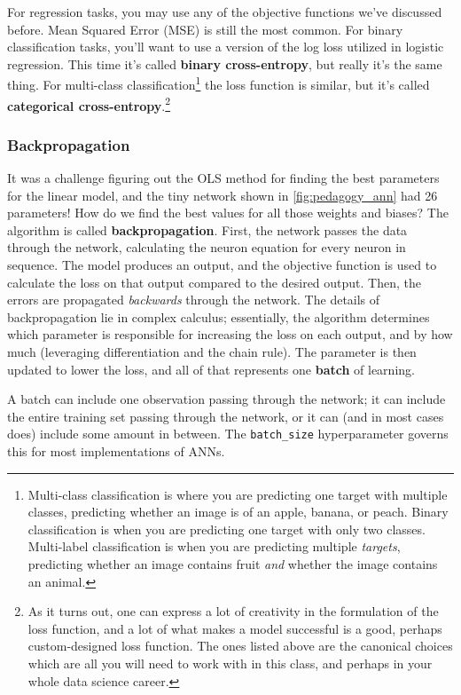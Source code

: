 For regression tasks, you may use any of the objective functions we've discussed before. Mean Squared Error (MSE) is still the most common. For binary classification tasks, you'll want to use a version of the log loss utilized in logistic regression. This time it's called \textbf{binary cross-entropy}, but really it's the same thing. For multi-class classification\footnote{Multi-class classification is where you are predicting one target with multiple classes, \eg{} predicting whether an image is of an apple, banana, or peach. Binary classification is when you are predicting one target with only two classes. Multi-label classification is when you are predicting multiple \textit{targets}, \eg{} predicting whether an image contains fruit \textit{and} whether the image contains an animal.} the loss function is similar, but it's called \textbf{categorical cross-entropy}.\footnote{As it turns out, one can express a lot of creativity in the formulation of the loss function, and a lot of what makes a model successful is a good, perhaps custom-designed loss function. The ones listed above are the canonical choices which are all you will need to work with in this class, and perhaps in your whole data science career.}

\subsubsection*{Backpropagation}
It was a challenge figuring out the OLS method for finding the best parameters for the linear model, and the tiny network shown in \autoref{fig:pedagogy_ann} had 26 parameters! How do we find the best values for all those weights and biases? The algorithm is called \textbf{backpropagation}. First, the network passes the data through the network, calculating the neuron equation for every neuron in sequence. The model produces an output, and the objective function is used to calculate the loss on that output compared to the desired output. Then, the errors are propagated \textit{backwards} through the network. The details of backpropagation lie in complex calculus; essentially, the algorithm determines which parameter is responsible for increasing the loss on each output, and by how much (leveraging differentiation and the chain rule). The parameter is then updated to lower the loss, and all of that represents one \textbf{batch} of learning.

A batch can include one observation passing through the network; it can include the entire training set passing through the network, or it can (and in most cases does) include some amount in between. The \texttt{batch\_size} hyperparameter governs this for most implementations of ANNs.

